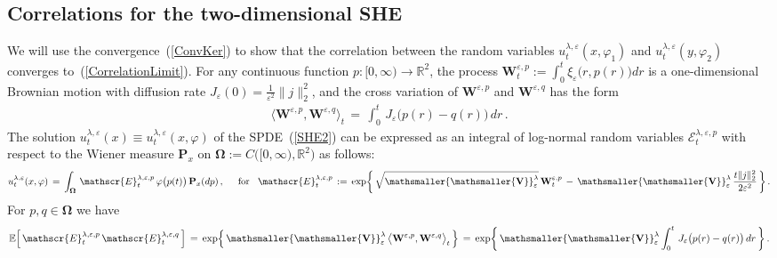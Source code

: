 \documentclass[10pt]{article}
\numberwithin{equation}{section}
\theoremstyle{definition}
\newcommand{\R}{{\mathbb R}}
\newcommand{\vsm}{{\mathsmaller{\mathsmaller{V}}}}
\begin{document}
\begin{appendix}

\section{Correlations for the two-dimensional SHE}  \label{AppendixSHE}



We will use the convergence~(\ref{ConvKer}) to show that the correlation between  the random variables $u^{\lambda,\varepsilon}_{t}(x,\varphi_1)$ and $u^{\lambda,\varepsilon}_{t}(y,\varphi_2)$ converges to~(\ref{CorrelationLimit}).  For any continuous function $p:[0,\infty)\rightarrow \R^2$, the process $\mathbf{W}^{\varepsilon,p}_t:=\int_0^t\xi_{\varepsilon}\big(r,p(r)\big)dr$ is a one-dimensional Brownian motion with diffusion rate $J_{\varepsilon}(0)=\frac{1}{\varepsilon^2}\|j\|_2^2$, and  the cross variation of $\mathbf{W}^{\varepsilon,p}$ and $  \mathbf{W}^{\varepsilon,q} $ has the form
\begin{align*} \big\langle \mathbf{W}^{\varepsilon,p},  \mathbf{W}^{\varepsilon,q}  \big\rangle_t \,  
 =\,\int_0^t\,J_{\varepsilon}\big(p(r)-q(r)\big)\,dr \,.
\end{align*}
The solution $u^{\lambda,\varepsilon}_{t}(x)\equiv u^{\lambda,\varepsilon}_{t}(x,\varphi)$ of the SPDE~(\ref{SHE2}) can be expressed as an integral of log-normal random variables $\mathscr{E}_t^{\lambda,\varepsilon,p}$ with respect to the  Wiener measure $ \mathbf{P}_x$ on $\boldsymbol{\Omega}:= C\big([0,\infty),\R^2\big) $ as follows:
\begin{align}\label{PathConst}
u^{\lambda,\varepsilon}_{t}(x,\varphi)\,=\,\int_{\boldsymbol{\Omega}} \, \mathscr{E}_t^{\lambda,\varepsilon,p}\,\varphi\big( p(t)\big)\, \mathbf{P}_x(dp) \, ,  \hspace{.5cm} \text{for}\hspace{.3cm} \mathscr{E}_t^{\lambda,\varepsilon,p}\,:=\,\textup{exp}\bigg\{\, \sqrt{\mathbf{\vsm}_{\varepsilon}^{\lambda} }\,\mathbf{W}^{\varepsilon,p}_t\,-\,\mathbf{\vsm}_{\varepsilon}^{\lambda}\,\frac{t\|j\|_2^2}{2\varepsilon^2} \, \bigg\}\,.
\end{align}
For $p,q\in \boldsymbol{\Omega}$ we have
\begin{align*}
   \mathbb{E}\Big[ \,\mathscr{E}_t^{\lambda,\varepsilon,p}\,\mathscr{E}_t^{\lambda,\varepsilon,q}\,\Big]\,=\,\textup{exp}\Big\{ \,  \mathbf{\vsm}_{\varepsilon}^{\lambda}\, \big\langle \mathbf{W}^{\varepsilon,p},  \mathbf{W}^{\varepsilon,q}  \big\rangle_t \, \Big\}
 \,=\,\textup{exp}\bigg\{\, \mathbf{\vsm}_{\varepsilon}^{\lambda} \int_0^t\,J_{\varepsilon}\big(p(r)-q(r)\big)\,dr \, \bigg\}\,.

\end{align*}
\end{appendix}
\end{document}
